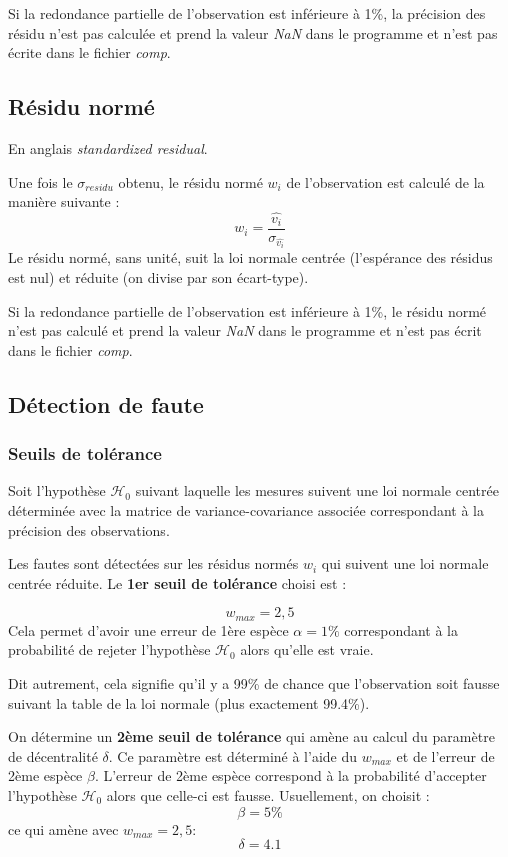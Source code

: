 \documentclass[french]{report}
\begin{document}
Si la redondance partielle de l'observation est inférieure à 1\%, la précision des résidu n'est pas calculée et prend la valeur \textit{NaN} dans le programme et n'est pas écrite dans le fichier \textit{comp}.


\subsection{Résidu normé}\label{standardized}

En anglais \textit{standardized residual}.

Une fois le $\sigma_{residu}$ obtenu, le résidu normé $w_i$ de l'observation est calculé de la manière suivante :
$$w_i=\frac{\hat{v_i}}{\sigma_{\hat{v_i}}}$$
Le résidu normé, sans unité, suit la loi normale centrée (l'espérance des résidus est nul) et réduite (on divise par son écart-type).

Si la redondance partielle de l'observation est inférieure à 1\%, le résidu normé n'est pas calculé et prend la valeur \textit{NaN} dans le programme et n'est pas écrit dans le fichier \textit{comp}.



\subsection{Détection de faute}


\subsubsection{Seuils de tolérance}

Soit l'hypothèse $\mathcal{H}_0$ suivant laquelle les mesures suivent une loi normale centrée
déterminée avec la matrice de variance-covariance associée correspondant à la précision des observations.

Les fautes sont détectées sur les résidus normés $w_i$ qui suivent une loi normale centrée réduite. Le \textbf{1er seuil de tolérance} choisi est :

$$w_{max}=2,5$$
Cela permet d'avoir une erreur de 1ère espèce $\alpha=1\%$ correspondant à la probabilité de rejeter l'hypothèse $\mathcal{H}_0$ alors qu'elle est vraie.

Dit autrement, cela signifie qu'il y a 99\% de chance que l'observation soit fausse suivant la table de la loi normale (plus exactement 99.4\%).

On détermine un \textbf{2ème seuil de tolérance} qui amène au calcul du paramètre de décentralité $\delta$.
Ce paramètre est déterminé à l'aide du $w_{max}$ et de l'erreur de 2ème espèce $\beta$.
L'erreur de 2ème espèce correspond à la probabilité d'accepter l'hypothèse $\mathcal{H}_0$ alors que celle-ci est fausse.
Usuellement, on choisit :
$$\beta=5\%$$
ce qui amène avec $w_{max}=2,5$:
$$\delta=4.1$$
\end{document}
